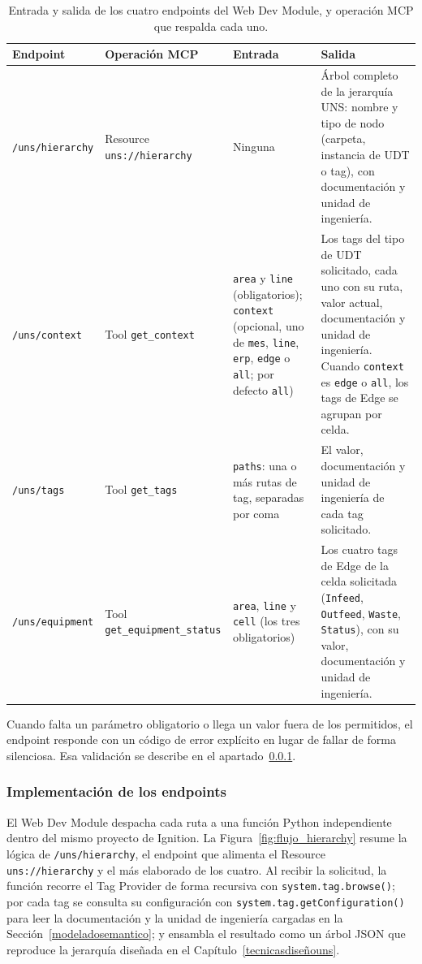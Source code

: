 \begin{table}[H]
\centering
\caption{Entrada y salida de los cuatro endpoints del Web Dev Module, y operación MCP que
respalda cada uno.}
\label{tab:io_endpoints}
\small
\renewcommand{\arraystretch}{1.4}
\begin{tabular}{@{}p{2.5cm}p{3.1cm}p{3.6cm}p{4.8cm}@{}}
\hline
\textbf{Endpoint} & \textbf{Operación MCP} & \textbf{Entrada} & \textbf{Salida} \\
\hline
\texttt{/uns/hierarchy} &
Resource \texttt{uns://}\allowbreak\texttt{hierarchy} &
Ninguna &
Árbol completo de la jerarquía UNS: nombre y tipo de nodo (carpeta, instancia de UDT
o tag), con documentación y unidad de ingeniería. \\
\texttt{/uns/context} &
Tool \texttt{get\_context} &
\texttt{area} y \texttt{line} (obligatorios); \texttt{context} (opcional, uno de
\texttt{mes}, \texttt{line}, \texttt{erp}, \texttt{edge} o \texttt{all}; por defecto
\texttt{all}) &
Los tags del tipo de UDT solicitado, cada uno con su ruta, valor actual, documentación y
unidad de ingeniería. Cuando \texttt{context} es \texttt{edge} o \texttt{all}, los tags de
Edge se agrupan por celda. \\
\texttt{/uns/tags} &
Tool \texttt{get\_tags} &
\texttt{paths}: una o más rutas de tag, separadas por coma &
El valor, documentación y unidad de ingeniería de cada tag solicitado. \\
\texttt{/uns/equipment} &
Tool \texttt{get\_equipment\_}\allowbreak\texttt{status} &
\texttt{area}, \texttt{line} y \texttt{cell} (los tres obligatorios) &
Los cuatro tags de Edge de la celda solicitada (\texttt{Infeed}, \texttt{Outfeed},
\texttt{Waste}, \texttt{Status}), con su valor, documentación y unidad de ingeniería. \\
\hline
\end{tabular}
\end{table}

Cuando falta un parámetro obligatorio o llega un valor fuera de los permitidos, el endpoint
responde con un código de error explícito en lugar de fallar de forma silenciosa. Esa
validación se describe en el apartado~\ref{implementacionendpoints}.

\subsubsection{Implementación de los endpoints}
\label{implementacionendpoints}

El Web Dev Module despacha cada ruta a una función Python independiente dentro del mismo
proyecto de Ignition. La Figura~\ref{fig:flujo_hierarchy} resume la lógica de
\texttt{/uns/hierarchy}, el endpoint que alimenta el Resource \texttt{uns://hierarchy} y el más
elaborado de los cuatro. Al recibir la solicitud,
la función recorre el Tag Provider de forma recursiva con \texttt{system.tag.browse()}; por
cada tag se consulta su configuración con \texttt{system.tag.getConfiguration()} para leer
la documentación y la unidad de ingeniería cargadas en la Sección~\ref{modeladosemantico}; y
ensambla el resultado como un árbol JSON que reproduce la jerarquía diseñada en el
Capítulo~\ref{tecnicasdiseñouns}.

